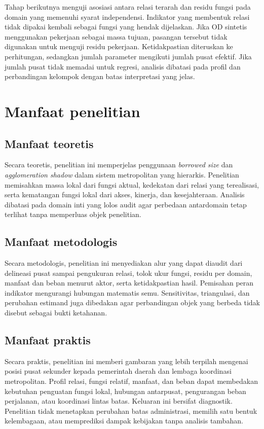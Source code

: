 \documentclass[11pt,a4paper,oneside,openany,indonesian]{report}
\begin{document}
Tahap berikutnya menguji asosiasi antara relasi terarah dan residu fungsi pada domain yang memenuhi syarat independensi. Indikator yang membentuk relasi tidak dipakai kembali sebagai fungsi yang hendak dijelaskan. Jika OD sintetis menggunakan pekerjaan sebagai massa tujuan, pasangan tersebut tidak digunakan untuk menguji residu pekerjaan. Ketidakpastian diteruskan ke perhitungan, sedangkan jumlah parameter mengikuti jumlah pusat efektif. Jika jumlah pusat tidak memadai untuk regresi, analisis dibatasi pada profil dan perbandingan kelompok dengan batas interpretasi yang jelas.

\section{Manfaat penelitian}

\subsection{Manfaat teoretis}

Secara teoretis, penelitian ini memperjelas penggunaan \emph{borrowed size} dan \emph{agglomeration shadow} dalam sistem metropolitan yang hierarkis. Penelitian memisahkan massa lokal dari fungsi aktual, kedekatan dari relasi yang terealisasi, serta kematangan fungsi lokal dari akses, kinerja, dan kesejahteraan. Analisis dibatasi pada domain inti yang lolos audit agar perbedaan antardomain tetap terlihat tanpa memperluas objek penelitian.

\subsection{Manfaat metodologis}

Secara metodologis, penelitian ini menyediakan alur yang dapat diaudit dari delineasi pusat sampai pengukuran relasi, tolok ukur fungsi, residu per domain, manfaat dan beban menurut aktor, serta ketidakpastian hasil. Pemisahan peran indikator mengurangi hubungan matematis semu. Sensitivitas, triangulasi, dan perubahan estimand juga dibedakan agar perbandingan objek yang berbeda tidak disebut sebagai bukti ketahanan.

\subsection{Manfaat praktis}

Secara praktis, penelitian ini memberi gambaran yang lebih terpilah mengenai posisi pusat sekunder kepada pemerintah daerah dan lembaga koordinasi metropolitan. Profil relasi, fungsi relatif, manfaat, dan beban dapat membedakan kebutuhan penguatan fungsi lokal, hubungan antarpusat, pengurangan beban perjalanan, atau koordinasi lintas batas. Keluaran ini bersifat diagnostik. Penelitian tidak menetapkan perubahan batas administrasi, memilih satu bentuk kelembagaan, atau memprediksi dampak kebijakan tanpa analisis tambahan.
\end{document}
